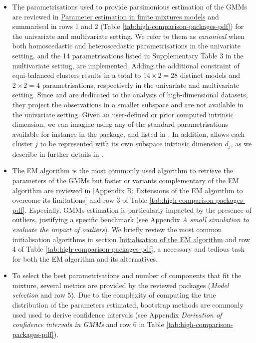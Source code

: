 \begin{itemize}
\item
  The parametrisations used to provide parsimonious estimation of the GMMs are reviewed in \protect\hyperlink{parameter-estimation-in-finite-mixtures-models}{Parameter estimation in finite mixtures models} and summarised in rows 1 and 2 (Table \ref{tab:high-comparison-packages-pdf}) for the univariate and multivariate setting. We refer to them as \emph{canonical} when both homoscedastic and heteroscedastic parametrisations in the univariate setting, and the 14 parametrisations listed in Supplementary Table 3 in the multivariate setting, are implemented. Adding the additional constraint of equi-balanced clusters results in a total to \(14 \times 2=28\) distinct models and \(2 \times 2=4\) parametrisations, respectively in the univariate and multivariate setting. Since  and  are dedicated to the analysis of high-dimensional datasets, they project the observations in a smaller subspace and are not available in the univariate setting. Given an user-defined or prior computed intrinsic dimension, we can imagine using any of the standard parametrisations available for instance in the  package, and listed in . In addition,  allows each cluster \(j\) to be represented with its own subspace intrinsic dimension \(d_j\), as we describe in further details in .
\item
  \protect\hyperlink{the-em-algorithm}{The EM algorithm} is the most commonly used
  algorithm to retrieve the parameters of the GMMs but faster or variants complementary of the EM algorithm are reviewed in {[}Appendix B: Extensions of the EM algorithm to overcome its limitations{]} and row 3 of Table \ref{tab:high-comparison-packages-pdf}. Especially, GMMs estimation is particularly impacted by the presence of outliers, justifying a specific benchmark (see Appendix \emph{A small simulation to evaluate the impact of outliers}).
  We briefly review the most common initialisation algorithms in section \protect\hyperlink{initialisation-of-the-em-algorithm}{Initialisation of the EM algorithm} and row 4 of Table \ref{tab:high-comparison-packages-pdf}, a necessary and tedious task for both the EM algorithm and its alternatives.
\item
  To select the best parametrisations and number of components that fit the mixture, several metrics are provided by the reviewed packages (\emph{Model selection} and row 5). Due to the complexity of computing the true distribution of the parameters estimated, bootstrap methods are commonly used used to derive confidence intervals (see Appendix \emph{Derivation of confidence intervals in GMMs} and row 6 in Table \ref{tab:high-comparison-packages-pdf}).
\end{itemize}

